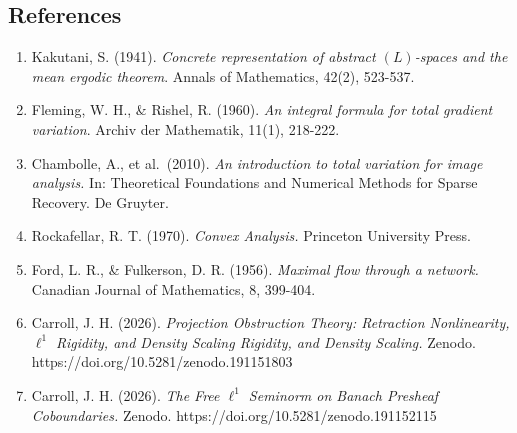 \documentclass[
]{article}
\providecommand{\tightlist}{%
  \setlength{\itemsep}{0pt}\setlength{\parskip}{0pt}}
\begin{document}
\subsection{References}\label{references}

\begin{enumerate}
\def\labelenumi{\arabic{enumi}.}
\tightlist
\item
  Kakutani, S. (1941). \emph{Concrete representation of abstract
  \((L)\)-spaces and the mean ergodic theorem}. Annals of Mathematics,
  42(2), 523-537.
\item
  Fleming, W. H., \& Rishel, R. (1960). \emph{An integral formula for
  total gradient variation}. Archiv der Mathematik, 11(1), 218-222.
\item
  Chambolle, A., et al.~(2010). \emph{An introduction to total variation
  for image analysis.} In: Theoretical Foundations and Numerical Methods
  for Sparse Recovery. De Gruyter.
\item
  Rockafellar, R. T. (1970). \emph{Convex Analysis.} Princeton
  University Press.
\item
  Ford, L. R., \& Fulkerson, D. R. (1956). \emph{Maximal flow through a
  network.} Canadian Journal of Mathematics, 8, 399-404.
\item
  Carroll, J. H. (2026). \emph{Projection Obstruction Theory: Retraction Nonlinearity, \(\ell^1\) Rigidity, and Density Scaling Rigidity, and Density Scaling.} Zenodo.
  https://doi.org/10.5281/zenodo.191151803
\item
  Carroll, J. H. (2026). \emph{The Free \(\ell^1\) Seminorm on Banach
  Presheaf Coboundaries.} Zenodo.
  https://doi.org/10.5281/zenodo.191152115
\end{enumerate}
\end{document}
